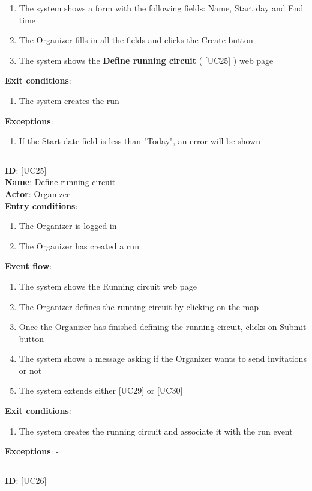 \documentclass[hidelinks, 12pt]{report}
\newcommand\usecase[1]{ [UC#1] }
\begin{document}
\begin{itemize}
\begin{enumerate}
			\item{The system shows a form with the following fields: Name, Start day and End time}
			\item{The Organizer fills in all the fields and clicks the Create button}
			\item{The system shows the \textbf{Define running circuit} (\usecase{25}) web page}
		\end{enumerate}
		\textbf{Exit conditions}:
		\begin{enumerate}
			\item{The system creates the run}
		\end{enumerate}
		\textbf{Exceptions}:
		\begin{enumerate}
			\item{If the Start date field is less than "Today", an error will be shown}
		\end{enumerate}
		\rule{\linewidth}{0.4pt}
		\textbf{ID}: \usecase{25} \\
		\textbf{Name}: Define running circuit \\
		\textbf{Actor}: Organizer \\
		\textbf{Entry conditions}:
		\begin{enumerate}
			\item{The Organizer is logged in}
			\item{The Organizer has created a run}
		\end{enumerate}
		\textbf{Event flow}:
		\begin{enumerate}
			\item{The system shows the Running circuit web page}
			\item{The Organizer defines the running circuit by clicking on the map}
			\item{Once the Organizer has finished defining the running circuit, clicks on Submit button}
			\item{The system shows a message asking if the Organizer wants to send invitations or not}
			\item{The system extends either \usecase{29} or \usecase{30}}
		\end{enumerate}
		\textbf{Exit conditions}:
		\begin{enumerate}
			\item{The system creates the running circuit and associate it with the run event}
		\end{enumerate}
		\textbf{Exceptions}: - \\
		\rule{\linewidth}{0.4pt}
		\textbf{ID}: \usecase{26} \\

\end{itemize}
\end{document}

